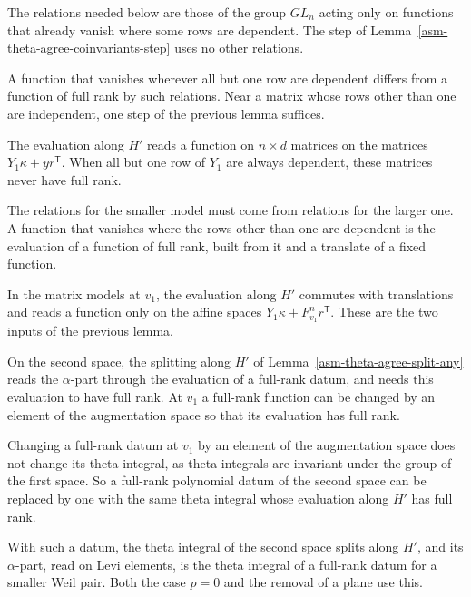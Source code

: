 The relations needed below are those of the group $GL_n$ acting only on
functions that already vanish where some rows are dependent. The step of
Lemma~\ref{asm-theta-agree-coinvariants-step} uses no other relations.

A function that vanishes wherever all but one row are dependent differs from a
function of full rank by such relations. Near a matrix whose rows other than
one are independent, one step of the previous lemma suffices.

The evaluation along $H'$ reads a function on $n\times d$ matrices on the
matrices $Y_1\kappa+yr^{\mathsf T}$. When all but one row of $Y_1$ are always
dependent, these matrices never have full rank.

The relations for the smaller model must come from relations for the larger
one. A function that vanishes where the rows other than one are dependent is
the evaluation of a function of full rank, built from it and a translate of a
fixed function.

In the matrix models at $v_1$, the evaluation along $H'$ commutes with
translations and reads a function only on the affine spaces
$Y_1\kappa+F_{v_1}^nr^{\mathsf T}$. These are the two inputs of the previous
lemma.

On the second space, the splitting along $H'$ of
Lemma~\ref{asm-theta-agree-split-any} reads the $\alpha$-part through the
evaluation of a full-rank datum, and needs this evaluation to have full rank. At
$v_1$ a full-rank function can be changed by an element of the augmentation
space so that its evaluation has full rank.

Changing a full-rank datum at $v_1$ by an element of the augmentation space
does not change its theta integral, as theta integrals are invariant under the
group of the first space. So a full-rank polynomial datum of the second space
can be replaced by one with the same theta integral whose evaluation along
$H'$ has full rank.

With such a datum, the theta integral of the second space splits along $H'$,
and its $\alpha$-part, read on Levi elements, is the theta integral of a
full-rank datum for a smaller Weil pair. Both the case $p=0$ and the removal of
a plane use this.


